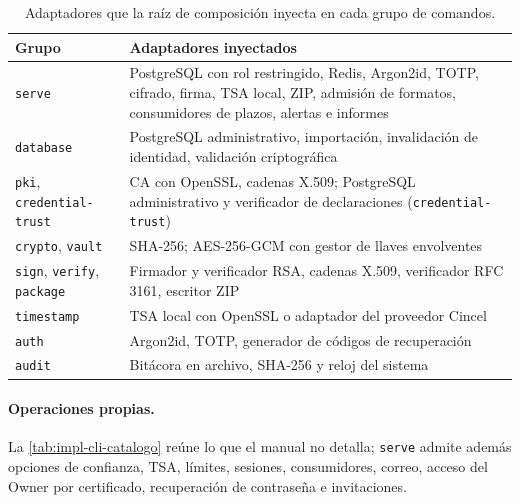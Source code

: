 \begin{table}[!tb]
  \centering
  \caption{Adaptadores que la raíz de composición inyecta en cada grupo de comandos.}
  \label{tab:impl-cli-casos}
  
  \begin{tabularx}{\linewidth}{@{}L{3.9cm} X@{}}
    \toprule
    \textbf{Grupo} & \textbf{Adaptadores inyectados} \\
    \midrule
    \texttt{serve} & PostgreSQL con rol restringido, Redis, Argon2id, TOTP, cifrado, firma, TSA local, ZIP, admisión de formatos, consumidores de plazos, alertas e informes \\
    \texttt{database} & PostgreSQL administrativo, importación, invalidación de identidad, validación criptográfica \\
    \texttt{pki}, \texttt{credential-trust} & CA con OpenSSL, cadenas X.509; PostgreSQL administrativo y verificador de declaraciones (\texttt{credential-trust}) \\
    \texttt{crypto}, \texttt{vault} & SHA-256; AES-256-GCM con gestor de llaves envolventes \\
    \texttt{sign}, \texttt{verify}, \texttt{package} & Firmador y verificador RSA, cadenas X.509, verificador RFC 3161, escritor ZIP \\
    \texttt{timestamp} & TSA local con OpenSSL o adaptador del proveedor Cincel \\
    \texttt{auth} & Argon2id, TOTP, generador de códigos de recuperación \\
    \texttt{audit} & Bitácora en archivo, SHA-256 y reloj del sistema \\
    \bottomrule
  \end{tabularx}
\end{table}

\paragraph{Operaciones propias.} La \cref{tab:impl-cli-catalogo} reúne lo que el manual no detalla; \texttt{serve} admite además opciones de confianza, TSA, límites, sesiones, consumidores, correo, acceso del Owner por certificado, recuperación de contraseña e invitaciones.


